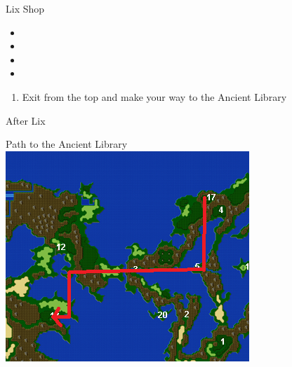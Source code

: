 \begin{paracol}{2}
\begin{shop}{Lix Shop}
    \varwb
    \begin{sell}
        \item {}
        \begin{itemize}
            \item \potion
            \item \silkRobe
            \item \elixir
            \item \thunderRod
        \end{itemize}
    \end{sell}
    \begin{buy}
        \item {} \kunai \space {}
        \item {} \waterScroll \space {}
        \item {} \thunderScroll \space {}
    \end{buy}
    \varwe
\end{shop}

\begin{enumerate}[resume]
    \item Exit from the top and make your way to the Ancient Library
\end{enumerate}

\switchcolumn
\begin{steproute}{After Lix}
\end{steproute}

\begin{misc}{Path to the Ancient Library}
    \includegraphics[scale=0.6]{../Graphics/Maps/4. To Ancient Library.png}
\end{misc}


\end{paracol}
